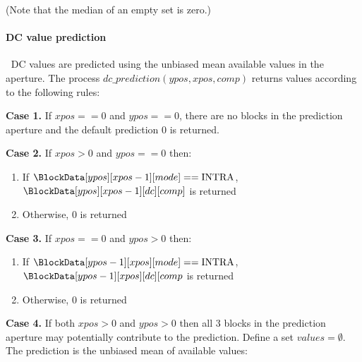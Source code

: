 (Note that the median of an empty set is zero.)

\paragraph{DC value prediction}
\label{dcprediction}
$\ $\newline
DC values are predicted using the unbiased mean available values in the aperture. The
process $dc\_prediction(ypos, xpos, comp)$ returns values according to
the following rules:

{\bf Case 1.}  If $xpos==0$ and $ypos==0$, there are no blocks in the prediction aperture and
the default prediction 0 is returned.

{\bf Case 2.} If $xpos>0$ and $ypos==0$ then:
\begin{enumerate}
   \item If $\BlockData[ypos][xpos-1][mode]==\Intra$, $\BlockData[ypos][xpos-1][dc][comp]$ is returned
   \item Otherwise, 0 is returned
\end{enumerate}

{\bf Case 3.} If $xpos==0$ and $ypos>0$ then:
\begin{enumerate}
   \item If $\BlockData[ypos-1][xpos][mode]==\Intra$, $\BlockData[ypos-1][xpos][dc][comp$ is returned
   \item Otherwise, 0 is returned
\end{enumerate}

{\bf Case 4.} If both $xpos>0$ and $ypos>0$ then all 3 blocks in the prediction aperture may potentially
contribute to the prediction. Define a set $values=\emptyset$. The prediction is the 
unbiased mean of available values:

\begin{pseudo*}
    \bsIF{\BlockData[ypos][xpos-1][mode]==\Intra}
    \bsEND
    \bsIF{\BlockData[ypos-1][xpos][mode]==\Intra}
    \bsEND
    \bsIF{\BlockData[ypos-1][xpos-1][mode]==\Intra}
    \bsEND

    \bsELSE
    \bsEND
\bsEND
\end{pseudo*}


